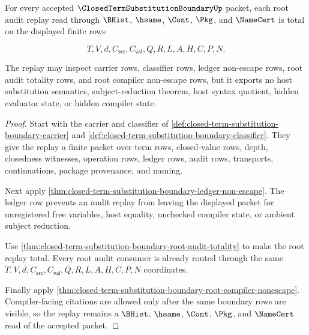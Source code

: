 \begin{theorem}
\label{thm:closed-term-substitution-boundary-root-audit-replay-totality}
For every accepted $\ClosedTermSubstitutionBoundaryUp$ packet, each root audit replay read through $\BHist$, $\hsame$, $\Cont$, $\Pkg$, and $\NameCert$ is total on the displayed finite rows

$$
T,V,d,C_{\mathsf{src}},C_{\mathsf{val}},Q,R,L,A,H,C,P,N.
$$

The replay may inspect carrier rows, classifier rows, ledger non-escape rows, root audit totality rows, and root compiler non-escape rows, but it exports no host substitution semantics, subject-reduction theorem, host syntax quotient, hidden evaluator state, or hidden compiler state.
\end{theorem}
\begin{proof}
Start with the carrier and classifier of \autoref{def:closed-term-substitution-boundary-carrier} and \autoref{def:closed-term-substitution-boundary-classifier}. They give the replay a finite packet over term rows, closed-value rows, depth, closedness witnesses, operation rows, ledger rows, audit rows, transports, continuations, package provenance, and naming.

Next apply \autoref{thm:closed-term-substitution-boundary-ledger-non-escape}. The ledger row prevents an audit replay from leaving the displayed packet for unregistered free variables, host equality, unchecked compiler state, or ambient subject reduction.

Use \autoref{thm:closed-term-substitution-boundary-root-audit-totality} to make the root replay total. Every root audit consumer is already routed through the same $T,V,d,C_{\mathsf{src}},C_{\mathsf{val}},Q,R,L,A,H,C,P,N$ coordinates.

Finally apply \autoref{thm:closed-term-substitution-boundary-root-compiler-nonescape}. Compiler-facing citations are allowed only after the same boundary rows are visible, so the replay remains a $\BHist$, $\hsame$, $\Cont$, $\Pkg$, and $\NameCert$ read of the accepted packet.
\end{proof}

